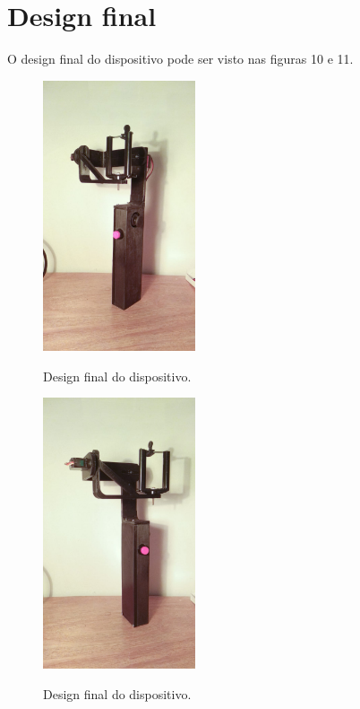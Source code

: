 \section{Design final}
O design final do dispositivo pode ser visto nas figuras 10 e 11.


\begin{figure}[H]
\centering
\includegraphics[width=0.4\textwidth]{Capitulo4 - Resultados/dir.jpeg}\\
\caption{\label{fig:widgets}Design final do dispositivo.}
\end{figure}

\begin{figure}[H]
\centering
\includegraphics[width=0.4\textwidth]{Capitulo4 - Resultados/esq.jpeg}\\
\caption{\label{fig:widgets}Design final do dispositivo.}
\end{figure}